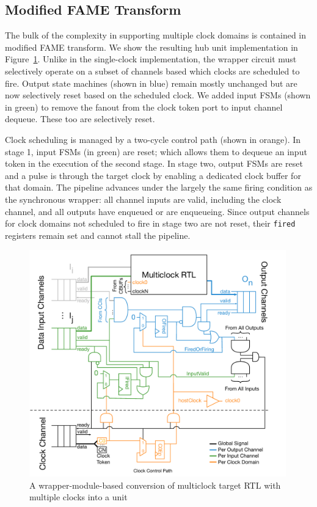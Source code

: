 \subsection{Modified FAME Transform}
The bulk of the complexity in supporting multiple clock domains is contained in
modified FAME transform. We show the resulting hub unit implementation in
Figure~\ref{fig:static-multiclock-wrapper}. Unlike in the single-clock
implementation, the wrapper circuit must selectively operate on a subset of
channels based which clocks are scheduled to fire.  Output state machines (shown in
blue) remain mostly unchanged but are now selectively reset based on the
scheduled clock.  We added input FSMs (shown in green) to remove the fanout from
the clock token port to input channel dequeue. These too are selectively reset.

Clock scheduling is managed by a two-cycle control path (shown in orange). In
stage 1, input FSMs (in green) are reset; which allows them to dequeue an input
token in the execution of the second stage. In stage two, output FSMs are reset and a
pulse is through the target clock by enabling a dedicated clock buffer for that
domain. The pipeline advances under the largely the same firing condition as the
synchronous wrapper: all channel inputs are valid, including the clock channel, and all outputs have
enqueued or are enqueueing. Since output channels for clock domains not scheduled to fire in
stage two are not reset, their \texttt{fired} registers remain set and cannot stall the pipeline.

\begin{figure}
    \centering
    \includegraphics[width=0.99\textwidth]{figures/static-multiclock-wrapper.pdf}
    \caption{A wrapper-module-based conversion of multiclock target RTL with multiple clocks into a unit}
    \label{fig:static-multiclock-wrapper}
\end{figure}

